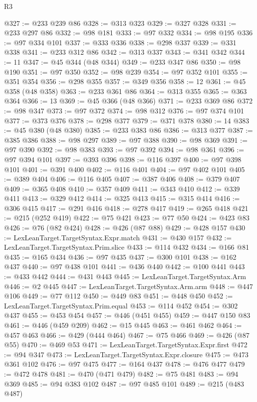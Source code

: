 \begin{lexlean}{R3}
\begin{coremodule}
@327 := @233 @239 @86
@328 := @313 @323
@329 := @327 @328
@331 := @233 @297 @86
@332 := @98 @181
@333 := @97 @332
@334 := @98 @195
@336 := @97 @334 @101
@337 := @333 @336
@338 := @298 @337
@339 := @331 @338
@341 := @233 @312 @86
@342 := @313 @337
@343 := @341 @342
@344 := 11
@347 := @45 @344 (@48 @344)
@349 := @233 @347 @86
@350 := @98 @190
@351 := @97 @350
@352 := @98 @239
@354 := @97 @352 @101
@355 := @351 @354
@356 := @298 @355
@357 := @349 @356
@358 := 12
@361 := @45 @358 (@48 @358)
@363 := @233 @361 @86
@364 := @313 @355
@365 := @363 @364
@366 := 13
@369 := @45 @366 (@48 @366)
@371 := @233 @369 @86
@372 := @98 @347
@373 := @97 @372
@374 := @98 @312
@376 := @97 @374 @101
@377 := @373 @376
@378 := @298 @377
@379 := @371 @378
@380 := 14
@383 := @45 @380 (@48 @380)
@385 := @233 @383 @86
@386 := @313 @377
@387 := @385 @386
@388 := @98 @297
@389 := @97 @388
@390 := @98 @369
@391 := @97 @390
@392 := @98 @383
@393 := @97 @392
@394 := @98 @361
@396 := @97 @394 @101
@397 := @393 @396
@398 := @116 @397
@400 := @97 @398 @101
@401 := @391 @400
@402 := @116 @401
@404 := @97 @402 @101
@405 := @389 @404
@406 := @116 @405
@407 := @387 @406
@408 := @379 @407
@409 := @365 @408
@410 := @357 @409
@411 := @343 @410
@412 := @339 @411
@413 := @329 @412
@414 := @325 @413
@415 := @315 @414
@416 := @306 @415
@417 := @291 @416
@418 := @278 @417
@419 := @265 @418
@421 := @215 (@252 @419)
@422 := @75 @421
@423 := @77 @50
@424 := @423 @83
@426 := @76 (@82 @424)
@428 := @426 (@87 @88)
@429 := @428 @157
@430 := LexLeanTarget.TargetSyntax.Expr.match
@431 := @430 @157
@432 := LexLeanTarget.TargetSyntax.Prim.slice
@433 := @114 @432
@434 := @166 @81
@435 := @165 @434
@436 := @97 @435
@437 := @300 @101
@438 := @162 @437
@440 := @97 @438 @101
@441 := @436 @440
@442 := @100 @441
@443 := @433 @442
@444 := @431 @443
@445 := LexLeanTarget.TargetSyntax.Arm
@446 := @2 @445
@447 := LexLeanTarget.TargetSyntax.Arm.arm
@448 := @447 @106
@449 := @77 @112
@450 := @449 @83
@451 := @448 @450
@452 := LexLeanTarget.TargetSyntax.Prim.equal
@453 := @114 @452
@454 := @302 @437
@455 := @453 @454
@457 := @446 (@451 @455)
@459 := @447 @150 @83
@461 := @446 (@459 @209)
@462 := @15 @445
@463 := @461 @462
@464 := @457 @463
@466 := @429 (@444 @464)
@467 := @75 @466
@469 := @426 (@87 @55)
@470 := @469 @53
@471 := LexLeanTarget.TargetSyntax.Expr.first
@472 := @94 @347
@473 := LexLeanTarget.TargetSyntax.Expr.closure
@475 := @473 @361 @102
@476 := @97 @475
@477 := @164 @437
@478 := @476 @477
@479 := @472 @478
@481 := @470 (@471 @479)
@482 := @75 @481
@483 := @94 @369
@485 := @94 @383 @102
@487 := @97 @485 @101
@489 := @215 (@483 @487)

\end{coremodule}
\end{lexlean}
